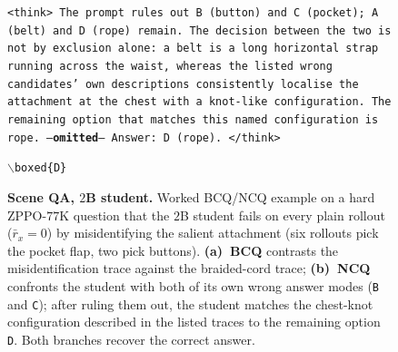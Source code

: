 \begin{figure}[!p]
\begin{prompttemplatefig}
\smallskip
\texttt{<think> The prompt rules out B (button) and C (pocket); A (belt) and D (rope) remain. The decision between the two is not by exclusion alone: a belt is a long horizontal strap running across the waist, whereas the listed wrong candidates' own descriptions consistently localise the attachment at the chest with a knot-like configuration. The remaining option that matches this named configuration is rope. ---\textbf{omitted}--- Answer: D (rope). </think>}

\smallskip
\texttt{$\backslash$boxed\{D\}} \quad \textcolor{posgain}{\checkmark}
\end{prompttemplatefig}

\caption{\textbf{Scene QA, $2$B student.} Worked BCQ/NCQ example on a hard ZPPO-$77$K question that the $2$B student fails on every plain rollout ($\bar{r}_x\!=\!0$) by misidentifying the salient attachment (six rollouts pick the pocket flap, two pick buttons). \textbf{(a)~BCQ} contrasts the misidentification trace against the braided-cord trace; \textbf{(b)~NCQ} confronts the student with both of its own wrong answer modes (\texttt{B} and \texttt{C}); after ruling them out, the student matches the chest-knot configuration described in the listed traces to the remaining option \texttt{D}. Both branches recover the correct answer.}
\label{fig:appendix:bcq_ncq_coat}
\end{figure}
